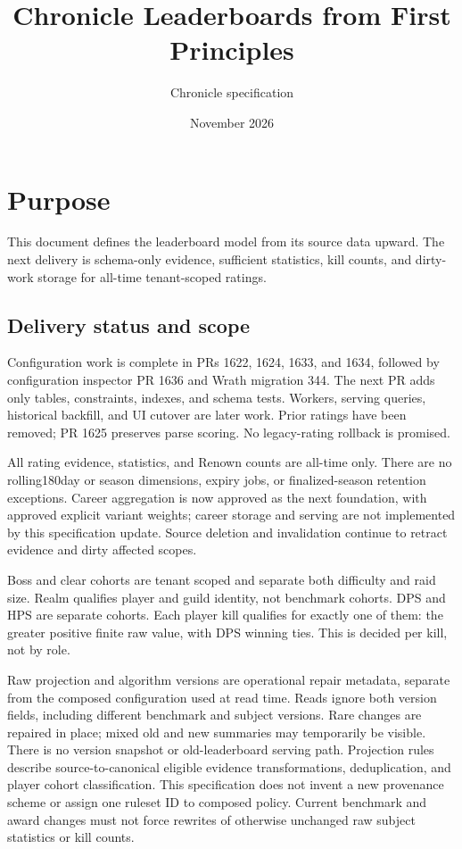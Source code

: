 \documentclass[11pt]{article}
\title{\textbf{Chronicle Leaderboards from First Principles}}
\author{Chronicle specification}
\date{November 2026}
\begin{document}
\maketitle

\section{Purpose}
This document defines the leaderboard model from its source data upward. The next delivery is schema-only evidence, sufficient statistics, kill counts, and dirty-work storage for all-time tenant-scoped ratings.

\subsection{Delivery status and scope}
Configuration work is complete in PRs 1622, 1624, 1633, and 1634, followed by configuration inspector PR 1636 and Wrath migration 344. The next PR adds only tables, constraints, indexes, and schema tests. Workers, serving queries, historical backfill, and UI cutover are later work. Prior ratings have been removed; PR 1625 preserves parse scoring. No legacy-rating rollback is promised.

All rating evidence, statistics, and Renown counts are all-time only. There are no rolling180day or season dimensions, expiry jobs, or finalized-season retention exceptions. Career aggregation is now approved as the next foundation, with approved explicit variant weights; career storage and serving are not implemented by this specification update. Source deletion and invalidation continue to retract evidence and dirty affected scopes.

Boss and clear cohorts are tenant scoped and separate both difficulty and raid size. Realm qualifies player and guild identity, not benchmark cohorts. DPS and HPS are separate cohorts. Each player kill qualifies for exactly one of them: the greater positive finite raw value, with DPS winning ties. This is decided per kill, not by role.

Raw projection and algorithm versions are operational repair metadata, separate from the composed configuration used at read time. Reads ignore both version fields, including different benchmark and subject versions. Rare changes are repaired in place; mixed old and new summaries may temporarily be visible. There is no version snapshot or old-leaderboard serving path. Projection rules describe source-to-canonical eligible evidence transformations, deduplication, and player cohort classification. This specification does not invent a new provenance scheme or assign one ruleset ID to composed policy. Current benchmark and award changes must not force rewrites of otherwise unchanged raw subject statistics or kill counts.
\end{document}
